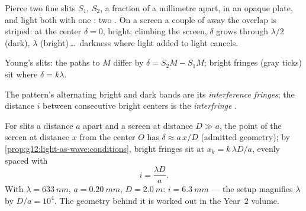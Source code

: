 \begin{example}\label{ex:g12:light-as-wave:young}
Pierce two fine slits $S_1$, $S_2$, a fraction of a millimetre apart,
in an opaque plate, and light both with one : two . On a screen a couple of  away the overlap is striped:
at the center $\delta = 0$, bright; climbing the screen, $\delta$
grows through $\lambda/2$ (dark), $\lambda$ (bright)\,\dots\ darkness
where light added to light cancels.
\end{example}

\begin{omfigure}

{\small Young's slits: the paths to $M$ differ by $\delta = S_2M -
S_1M$; bright fringes (gray ticks) sit where $\delta = k\lambda$.}
\end{omfigure}

\begin{definition}\label{def:g12:light-as-wave:fringes}
The pattern's alternating bright and dark bands are its
\emph{interference fringes}; the distance
$i$ between consecutive bright centers is the \emph{interfringe}%
.
\end{definition}

\begin{proposition}\label{prop:g12:light-as-wave:interfringe}
For slits a distance $a$ apart and a screen at distance $D \gg a$,
the point of the screen at distance $x$ from the center $O$ has  $\delta \approx a\,x/D$ (admitted geometry); by
\cref{prop:g12:light-as-wave:conditions}, bright fringes sit at
$x_k = k\,\lambda D/a$, evenly spaced with 
\[
i = \frac{\lambda D}{a}.
\]
With $\lambda = \qty{633}{nm}$, $a = \qty{0.20}{mm}$, $D =
\qty{2.0}{m}$: $i = \qty{6.3}{mm}$ --- the setup magnifies $\lambda$
by $D/a = 10^4$. The geometry behind it is worked out in the Year~2
volume.
\end{proposition}
\admitted

